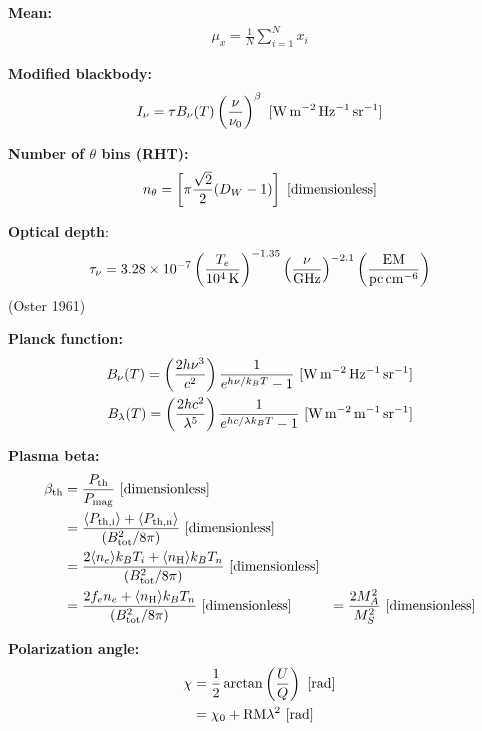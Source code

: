 \documentclass[a4paper,10pt]{article}
\begin{document}
{\noindent}\textbf{Mean:} 
\begin{align*}
    \mu_x = \frac{1}{N} \sum_{i=1}^N x_i
\end{align*}

{\noindent}\textbf{Modified blackbody:}
\begin{align*}
    I_\nu = \tau B_\nu(T) \left(\frac{\nu}{\nu_0}\right)^\beta ~ [{\rm W\,m^{-2}\,Hz^{-1}\,sr^{-1}}]
\end{align*}

{\noindent}\textbf{Number of $\theta$ bins (RHT):}
\begin{align*}
    n_\theta = \left[\pi\frac{\sqrt{2}}{2}(D_W-1)\right] ~ [{\rm dimensionless}]
\end{align*}

{\noindent}\textbf{Optical depth}:
\begin{align*}
    \tau_\nu = 3.28\times10^{-7} \left(\frac{T_e}{10^4\,{\rm K}}\right)^{-1.35} \left(\frac{\nu}{\rm GHz}\right)^{-2.1} \left(\frac{\rm EM}{\rm pc\,cm^{-6}}\right)
\end{align*}
(Oster 1961)

{\noindent}\textbf{Planck function:}
\begin{align*}
    B_\nu(T) = \left(\frac{2h\nu^3}{c^2}\right) \frac{1}{e^{h\nu/k_BT}-1} ~ [{\rm W\,m^{-2}\,Hz^{-1}\,sr^{-1}}] \\
    B_\lambda(T) = \left(\frac{2hc^2}{\lambda^5}\right) \frac{1}{e^{hc/\lambda k_BT}-1} ~ [{\rm W\,m^{-2}\,m^{-1}\,sr^{-1}}]
\end{align*}

{\noindent}\textbf{Plasma beta:} 
\begin{align*}
\beta_{\rm th} &= \frac{P_{\rm th}}{P_{\rm mag}} ~ [{\rm dimensionless}]\\
                      &= \frac{ \langle P_{\rm th,i}\rangle + \langle P_{\rm th,n}\rangle }{(B_{\rm tot}^2/8\pi)} ~ [{\rm dimensionless}] \\
                      &= \frac{2\langle n_e\rangle k_BT_i + \langle n_{\rm H}\rangle k_BT_n}{(B_{\rm tot}^2/8\pi)}  ~ [{\rm dimensionless}] \\
                      &= \frac{2f_en_e+ \langle n_{\rm H}\rangle k_BT_n}{(B_{\rm tot}^2/8\pi)}  ~ [{\rm dimensionless}]
                      &= \frac{2M_A^2}{M_S^2} ~ [{\rm dimensionless}]
\end{align*}

{\noindent}\textbf{Polarization angle:}
\begin{align*}
\chi &= \dfrac{1}{2}\arctan\left(\dfrac{U}{Q}\right) ~ [{\rm rad}] \\
&= \chi_0 + \mathrm{RM}\lambda^2 ~ [{\rm rad}]
\end{align*}
\end{document}
